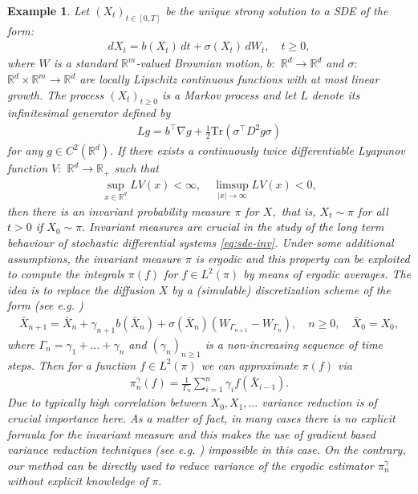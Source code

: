 \documentclass[preprint]{imsart}
\newtheorem{example}{Example}
\begin{document}
\begin{example}
  Let \((X_t)_{t\in [0,T]}\) be the unique strong solution to a  SDE of the form:
\begin{eqnarray}
\label{eq:sde-inv}
dX_t=b(X_t)\,dt+\sigma(X_t)\,dW_t,\quad t\geq 0,	
\end{eqnarray}
where \(W\) is a standard \(\mathbb{R}^m\)-valued Brownian motion, \(b:\) \(\mathbb{R}^d\to \mathbb{R}^d\) and \(\sigma:\) \(\mathbb{R}^d\times \mathbb{R}^m \to \mathbb{R}^d\) are locally Lipschitz continuous functions with at most linear growth.
The process \((X_t)_{t\geq 0}\) is a Markov
process and let \(L\) denote its infinitesimal generator defined by 
\begin{eqnarray*}
Lg=b^\top \nabla g+\frac{1}{2}\text{Tr}(\sigma^\top D^2g\sigma)
\end{eqnarray*}
for any \(g\in C^2(\mathbb{R}^d).\) 
If there exists a continuously twice differentiable Lyapunov function \(V:\) \(\mathbb{R}^d\to \mathbb{R}_{+}\) such that 
\begin{eqnarray*}
\sup_{x\in \mathbb{R}^d} LV(x) <\infty,\quad \limsup_{|x|\to \infty} LV(x)<0,
\end{eqnarray*}
then there is an invariant probability measure \(\pi\)  for \(X,\) that is, \(X_t\sim \pi\) for all \(t> 0\) if \(X_0\sim \pi.\) Invariant measures are crucial in the study of the long term behaviour of stochastic differential
systems \eqref{eq:sde-inv}.    Under some additional assumptions,  the invariant
measure \(\pi\) is  ergodic and this property
can be exploited  to compute  the integrals \(\pi(f)\) for \(f\in L^2(\pi)\) by means of ergodic averages. The idea is to replace the diffusion \(X\) by a (simulable) discretization scheme of the form (see e.g. \cite{MR3861816})
\begin{eqnarray*}
\bar X_{n+1}=\bar X_n+\gamma_{n+1} b(\bar X_n)+\sigma(\bar X_n)(W_{\Gamma_{n+1}}-W_{\Gamma_n}), \quad n\geq 0,\quad \bar X_0=X_0,
\end{eqnarray*}
where \(\Gamma_n=\gamma_1+\ldots+\gamma_n\) and \((\gamma_n)_{n\geq 1}\) is a non-increasing sequence of time steps. Then for a function \(f\in L^2(\pi)\) we can approximate \(\pi(f)\) via
\begin{eqnarray*}
\pi_n^\gamma(f)=\frac{1}{\Gamma_n}\sum_{i=1}^n \gamma_{i}f(\bar X_{i-1}).
\end{eqnarray*}
Due to typically high correlation between \(X_0,X_1,\ldots\)  variance reduction is of crucial importance here.  
As a matter of fact, in many cases there is no explicit formula for the invariant measure and this makes the use of gradient  based  variance reduction techniques (see e.g. \cite{mira2013zero})   impossible in this case.
On the contrary, our method can be directly used to reduce variance of the ergodic estimator \(\pi_n^\gamma\) without explicit knowledge of \(\pi.\) 
\end{example}
\end{document}

